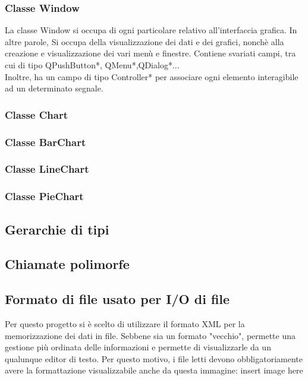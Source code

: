 \documentclass[10pt]{article}
\begin{document}
    \subsubsection{Classe Window}
    La classe Window si occupa di ogni particolare relativo all'interfaccia grafica. In altre parole, Si occupa della visualizzazione dei dati e dei grafici, nonchè alla creazione e visualizzazione dei vari menù e finestre. Contiene svariati campi, tra cui di tipo QPushButton*, QMenu*,QDialog*...\\Inoltre, ha un campo di tipo Controller* per associare ogni elemento interagibile ad un determinato segnale.
    \subsubsection{Classe Chart}
    \subsubsection{Classe BarChart}
    \subsubsection{Classe LineChart}
    \subsubsection{Classe PieChart}
    \subsection{Gerarchie di tipi}
    \subsection{Chiamate polimorfe}
    \subsection{Formato di file usato per I/O di file}
    Per questo progetto si è scelto di utilizzare il formato XML per la memorizzazione dei dati in file. Sebbene sia un formato "vecchio", permette una gestione più ordinata delle informazioni e permette di visualizzarle da un qualunque editor di testo.
    Per questo motivo, i file letti devono obbligatoriamente avere la formattazione visualizzabile anche da questa immagine: insert image here
	
\end{document}
